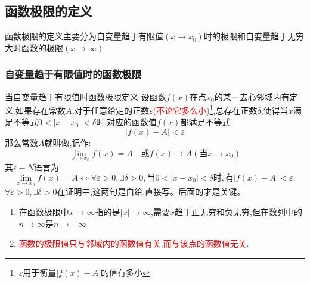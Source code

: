 \documentclass[9pt a4paper, oneside, UTF8]{ctexbook}
\begin{document}
\begin{sloppypar}
    \subsection{函数极限的定义}
    函数极限的定义主要分为自变量趋于有限值$(x \to x_0)$时的极限和自变量趋于无穷大时函数的极限$(x \to \infty)$
    \subsubsection{自变量趋于有限值时的函数极限}
    \begin{defn}{当自变量趋于有限值时函数极限定义}{}
        设函数$f(x)$在点$x_0$的某一去心邻域内有定义.如果存在常数$A$,对于任意给定的正数$\varepsilon$\textcolor{red}{(不论它多么小)\footnote{$\varepsilon$用于衡量$|f(x)-A|$的值有多小}},总存在正数$\delta$,使得当$x$满足不等式$0<|x-x_0|<\delta$时,对应的函数值$f(x)$都满足不等式
        $$
            |f(x)-A|<\varepsilon
        $$
        那么常数$A$就叫做,记作:
        $$
            \lim_{x\to x_0}f(x)=A\quad\text{或}f(x)\to A(\text{当}x\to x_0)
        $$
        其$\varepsilon-N$语言为
        $$
            \lim_{x\to x_0}f(x)=A\Leftrightarrow\forall\varepsilon>0,\exists\delta>0,\text{当}0<|x-x_0|<\delta\text{时},\text{有}|f(x)-A|<\varepsilon.
        $$
        $\forall\varepsilon>0,\exists\delta>0$在证明中,这两句是白给,直接写。后面的才是关键。
    \end{defn}
    \begin{criterion}{}{}
        \begin{enumerate}
            \item 在函数极限中$x \to \infty$指的是$|x| \to \infty$,需要$x$趋于正无穷和负无穷,但在数列中的$n \to \infty$是$n \to +\infty$
            \item \textcolor{red}{函数的极限值只与邻域内的函数值有关,而与该点的函数值无关}.
        \end{enumerate}
    \end{criterion}

\end{sloppypar}
\end{document}
